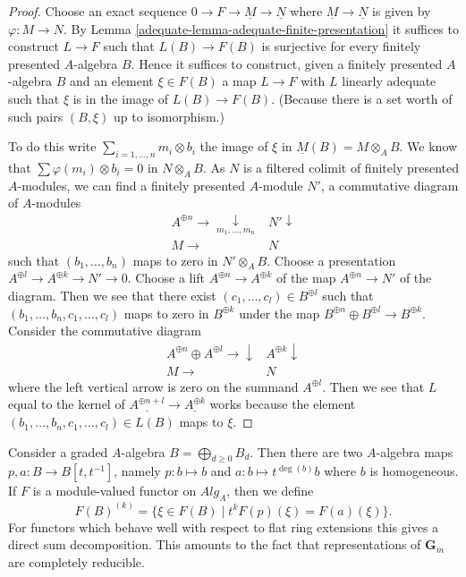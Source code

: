 \begin{proof}

Choose an exact sequence $0 \to F \to \underline{M} \to \underline{N}$
where $\underline{M} \to \underline{N}$ is given by
$\varphi : M \to N$. By
Lemma \ref{adequate-lemma-adequate-finite-presentation}
it suffices to construct $L \to F$ such that $L(B) \to F(B)$ is surjective
for every finitely presented $A$-algebra $B$. Hence it suffices to construct,
given a finitely presented $A$-algebra $B$ and an element $\xi \in F(B)$
a map $L \to F$ with $L$ linearly adequate such that $\xi$ is in the image
of $L(B) \to F(B)$.
(Because there is a set worth of such pairs $(B, \xi)$ up to isomorphism.)

\medskip\noindent
To do this write $\sum_{i = 1, \ldots, n} m_i \otimes b_i$ the image of
$\xi$ in $\underline{M}(B) = M \otimes_A B$. We know that
$\sum \varphi(m_i) \otimes b_i = 0$ in $N \otimes_A B$.
As $N$ is a filtered colimit of finitely presented $A$-modules, we can
find a finitely presented $A$-module $N'$, a commutative diagram
of $A$-modules
$$
\begin{array}{cc}A^{\oplus n} \longrightarrow\underset{m_1, \ldots, m_n}{\downarrow} & N' \downarrow \\ M \longrightarrow & N\end{array}
$$
such that $(b_1, \ldots, b_n)$ maps to zero in $N' \otimes_A B$.
Choose a presentation $A^{\oplus l} \to A^{\oplus k} \to N' \to 0$.
Choose a lift $A^{\oplus n} \to A^{\oplus k}$ of the map
$A^{\oplus n} \to N'$ of the diagram. Then we see that there exist
$(c_1, \ldots, c_l) \in B^{\oplus l}$ such that
$(b_1, \ldots, b_n, c_1, \ldots, c_l)$ maps to zero in $B^{\oplus k}$
under the map $B^{\oplus n} \oplus B^{\oplus l} \to B^{\oplus k}$.
Consider the commutative diagram
$$
\begin{array}{cc}A^{\oplus n} \oplus A^{\oplus l} \longrightarrow\downarrow & A^{\oplus k} \downarrow \\ M \longrightarrow & N\end{array}
$$
where the left vertical arrow is zero on the summand $A^{\oplus l}$.
Then we see that $L$ equal to the kernel of $\underline{A^{\oplus n + l}}
\to \underline{A^{\oplus k}}$ works because the element
$(b_1, \ldots, b_n, c_1, \ldots, c_l) \in L(B)$ maps to $\xi$.
\end{proof}

Consider a graded $A$-algebra $B = \bigoplus_{d \geq 0} B_d$. Then there are
two $A$-algebra maps $p, a : B \to B[t, t^{-1}]$, namely $p : b \mapsto b$ and
$a : b \mapsto t^{\deg(b)} b$ where $b$ is homogeneous. If $F$ is a
module-valued functor on $\textit{Alg}_A$, then we define
\begin{equation}
\label{equation-weight-k}
F(B)^{(k)} = \{\xi \in F(B) \mid t^k F(p)(\xi) = F(a)(\xi)\}.
\end{equation}
For functors which behave well with respect to flat ring extensions
this gives a direct sum decomposition. This amounts to the fact that
representations of $\mathbf{G}_m$ are completely reducible.

